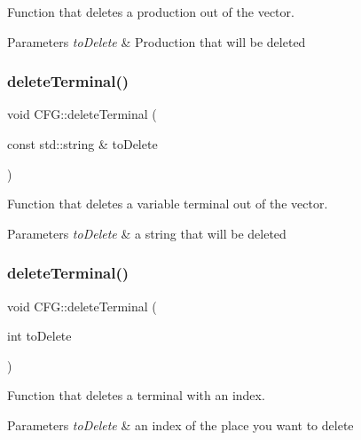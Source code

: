 Function that deletes a production out of the vector. 


\begin{DoxyParams}{Parameters}
{\em to\+Delete} & Production that will be deleted \\
\hline
\end{DoxyParams}
\mbox{\label{classCFG_a9d54aff45017bc0b4db3ec471d19cd5e}} 
\subsubsection{\texorpdfstring{delete\+Terminal()}{deleteTerminal()}\hspace{0.1cm}{\footnotesize\ttfamily [1/2]}}
{\footnotesize\ttfamily void C\+F\+G\+::delete\+Terminal (\begin{DoxyParamCaption}\item[{const std\+::string \&}]{to\+Delete }\end{DoxyParamCaption})}



Function that deletes a variable terminal out of the vector. 


\begin{DoxyParams}{Parameters}
{\em to\+Delete} & a string that will be deleted \\
\hline
\end{DoxyParams}
\mbox{\label{classCFG_aab9bd96ae82912ea2b20bcd1bfc82e14}} 
\subsubsection{\texorpdfstring{delete\+Terminal()}{deleteTerminal()}\hspace{0.1cm}{\footnotesize\ttfamily [2/2]}}
{\footnotesize\ttfamily void C\+F\+G\+::delete\+Terminal (\begin{DoxyParamCaption}\item[{int}]{to\+Delete }\end{DoxyParamCaption})}



Function that deletes a terminal with an index. 


\begin{DoxyParams}{Parameters}
{\em to\+Delete} & an index of the place you want to delete \\
\hline
\end{DoxyParams}
\mbox{\label{classCFG_a31abe7c6d17b7d71e1cd22cc57b4bc4d}} 
